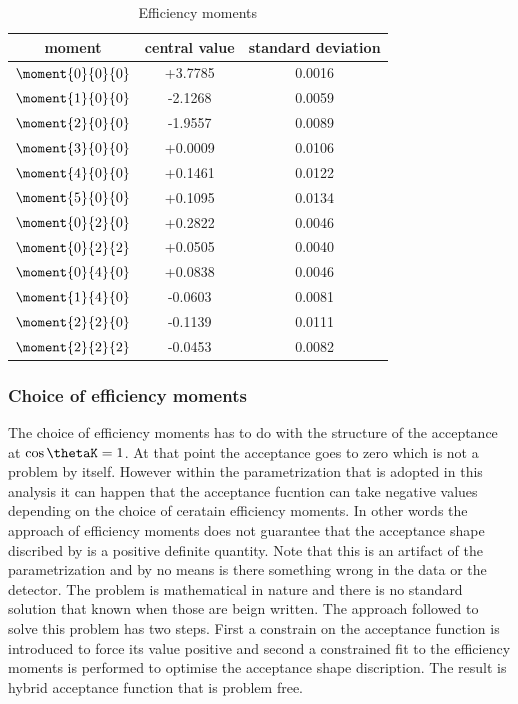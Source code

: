 \begin{table}[h]
  \centering 
  \caption{ Efficiency moments }
  \renewcommand{\arraystretch}{1.2}
  \label{eff_moms_table}
  \begin{tabular}{ccc}
    \hline
    moment & central value & standard deviation \\
    \hline
    $\moment{0}{0}{0}$ & +3.7785  & 0.0016 \\
    $\moment{1}{0}{0}$ & -2.1268  & 0.0059 \\
    $\moment{2}{0}{0}$ & -1.9557  & 0.0089 \\
    $\moment{3}{0}{0}$ & +0.0009  & 0.0106 \\    
    $\moment{4}{0}{0}$ & +0.1461  & 0.0122 \\
    $\moment{5}{0}{0}$ & +0.1095  & 0.0134 \\
    
    $\moment{0}{2}{0}$ & +0.2822  & 0.0046 \\
    $\moment{0}{2}{2}$ & +0.0505  & 0.0040 \\
    $\moment{0}{4}{0}$ & +0.0838  & 0.0046 \\

    $\moment{1}{4}{0}$ & -0.0603  & 0.0081 \\
    $\moment{2}{2}{0}$ & -0.1139  & 0.0111 \\
    $\moment{2}{2}{2}$ & -0.0453  & 0.0082 \\
\hline
  \end{tabular}
\end{table}  


\subsubsection{Choice of efficiency moments}
The choice of efficiency moments has to do with the structure of the acceptance at $\cos\thetaK=1$. At that point the acceptance goes to zero
which is not a problem by itself. However within the parametrization that is adopted in this analysis it can happen that the acceptance fucntion
 can take negative values depending on the choice of ceratain efficiency moments. In other words the approach of efficiency moments does
not guarantee that the acceptance shape discribed by  is a positive definite quantity. Note that this is an artifact of the parametrization
and by no means is there something wrong in the data or the detector. The problem is mathematical in nature and there is no standard solution that known
when those are beign written. The approach followed to solve this problem has two steps. First a constrain on the acceptance function  is 
introduced to force its value positive and second a constrained fit to the efficiency moments is performed to optimise the acceptance shape discription.
The result is hybrid acceptance function that is problem free. 


